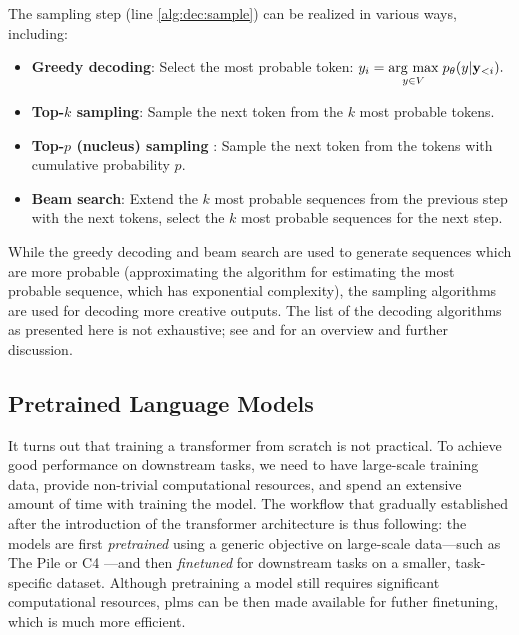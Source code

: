 {\noindent The sampling step (line \ref{alg:dec:sample}) can be realized in various ways, including:
\begin{itemize}
    \item \textbf{Greedy decoding}: Select the most probable token: $y_i = \underset{y \in V}{\operatorname{arg}\,\operatorname{max}}\; p_\theta(y|\mathbf{y}_{<i}).$
    \item \textbf{Top-$k$ sampling}: Sample the next token from the $k$ most probable tokens.
    \item \textbf{Top-$p$ (nucleus) sampling} \cite{holtzman2019curious}: Sample the next token from the tokens with cumulative probability $p$.
    \item \textbf{Beam search}: Extend the $k$ most probable sequences from the previous step with the next tokens, select the $k$ most probable sequences for the next step.
\end{itemize}
While the greedy decoding and beam search are used to generate sequences which are more probable (approximating the algorithm for estimating the most probable sequence, which has exponential complexity), the sampling algorithms are used for decoding more creative outputs. The list of the decoding algorithms as presented here is not exhaustive; see \citet{zarriess2021decoding} and \citet{wiher2022decoding} for an overview and further discussion.

\subsection{Pretrained Language Models}
\label{sec:plms}
It turns out that training a transformer from scratch is not practical. To achieve good performance on downstream tasks, we need to have large-scale training data, provide non-trivial computational resources, and spend an extensive amount of time with training the model. The workflow that gradually established after the introduction of the transformer architecture is thus following: the models are first \emph{pretrained} using a generic objective on large-scale data---such as The Pile \cite{gao2020pile} or C4 \cite{raffelExploringLimitsTransfer2019}---and then \emph{finetuned} for downstream tasks on a smaller, task-specific dataset. Although pretraining a model still requires significant computational resources, \acp{plm} can be then made available for futher finetuning, which is much more efficient.


}

